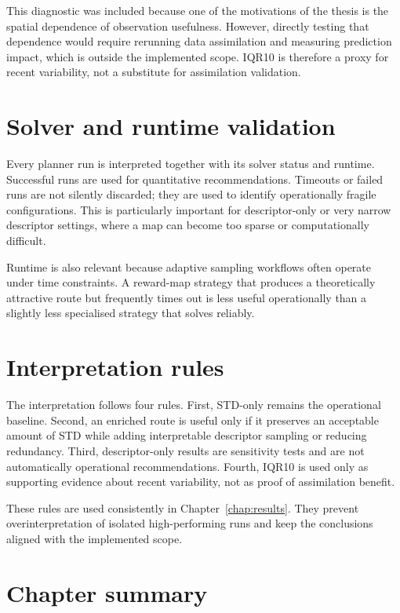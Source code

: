 This diagnostic was included because one of the motivations of the thesis is the spatial dependence of observation usefulness. However, directly testing that dependence would require rerunning data assimilation and measuring prediction impact, which is outside the implemented scope. IQR10 is therefore a proxy for recent variability, not a substitute for assimilation validation.

\section{Solver and runtime validation}

Every planner run is interpreted together with its solver status and runtime. Successful runs are used for quantitative recommendations. Timeouts or failed runs are not silently discarded; they are used to identify operationally fragile configurations. This is particularly important for descriptor-only or very narrow descriptor settings, where a map can become too sparse or computationally difficult.

Runtime is also relevant because adaptive sampling workflows often operate under time constraints. A reward-map strategy that produces a theoretically attractive route but frequently times out is less useful operationally than a slightly less specialised strategy that solves reliably.

\section{Interpretation rules}

The interpretation follows four rules. First, STD-only remains the operational baseline. Second, an enriched route is useful only if it preserves an acceptable amount of STD while adding interpretable descriptor sampling or reducing redundancy. Third, descriptor-only results are sensitivity tests and are not automatically operational recommendations. Fourth, IQR10 is used only as supporting evidence about recent variability, not as proof of assimilation benefit.

These rules are used consistently in Chapter~\ref{chap:results}. They prevent overinterpretation of isolated high-performing runs and keep the conclusions aligned with the implemented scope.

\section{Chapter summary}

